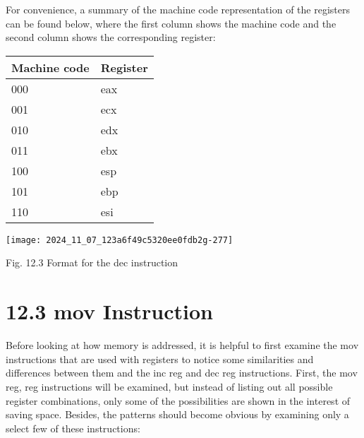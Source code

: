 \documentclass[10pt]{article}
\begin{document}
For convenience, a summary of the machine code representation of the registers can be found below, where the first column shows the machine code and the second column shows the corresponding register:

\begin{center}
\begin{tabular}{|l|l|}
\hline
Machine code & Register \\
\hline
000 & eax \\
\hline
001 & ecx \\
\hline
010 & edx \\
\hline
011 & ebx \\
\hline
100 & esp \\
\hline
101 & ebp \\
\hline
110 & esi \\
\hline
\end{tabular}
\end{center}

\begin{center}
\texttt{[image: 2024\_11\_07\_123a6f49c5320ee0fdb2g-277]}
\end{center}

Fig. 12.3 Format for the dec instruction

\section*{12.3 mov Instruction}
Before looking at how memory is addressed, it is helpful to first examine the mov instructions that are used with registers to notice some similarities and differences between them and the inc reg and dec reg instructions. First, the mov reg, reg instructions will be examined, but instead of listing out all possible register combinations, only some of the possibilities are shown in the interest of saving space. Besides, the patterns should become obvious by examining only a select few of these instructions:
\end{document}
